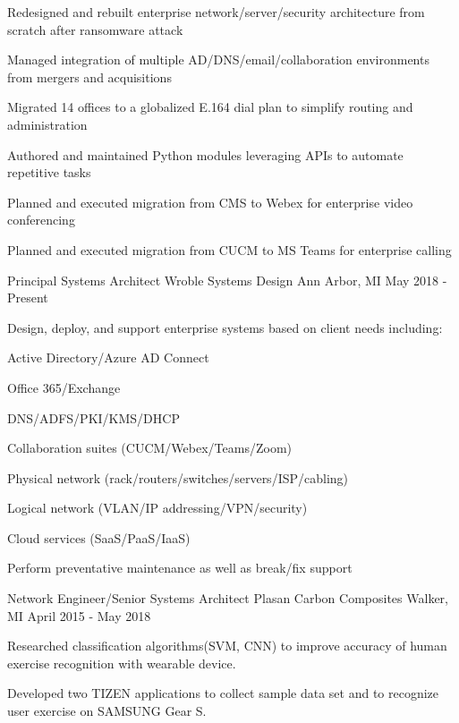 \begin{cventries}
{\begin{cvitems}
        \item {Redesigned and rebuilt enterprise network/server/security architecture from scratch after ransomware attack}
        \item {Managed integration of multiple AD/DNS/email/collaboration environments from mergers and acquisitions}
        \item {Migrated 14 offices to a globalized E.164 dial plan to simplify routing and administration}
        \item {Authored and maintained Python modules leveraging APIs to automate repetitive tasks}
        \item {Planned and executed migration from CMS to Webex for enterprise video conferencing}
        \item {Planned and executed migration from CUCM to MS Teams for enterprise calling}
      \end{cvitems}
    }

  \cventry
    {Principal Systems Architect} %
    {Wroble Systems Design} %
    {Ann Arbor, MI} %
    {May 2018 - Present} %
    {
      \begin{cvitems} %
        \item {Design, deploy, and support enterprise systems based on client needs including:}
        \item {Active Directory/Azure AD Connect}
        \item {Office 365/Exchange}
        \item {DNS/ADFS/PKI/KMS/DHCP}
        \item {Collaboration suites (CUCM/Webex/Teams/Zoom)}
        \item {Physical network (rack/routers/switches/servers/ISP/cabling)}
        \item {Logical network (VLAN/IP addressing/VPN/security)}
        \item {Cloud services (SaaS/PaaS/IaaS)}
        \item {Perform preventative maintenance as well as break/fix support}
      \end{cvitems}
    }

  \cventry
    {Network Engineer/Senior Systems Architect} %
    {Plasan Carbon Composites} %
    {Walker, MI} %
    {April 2015 - May 2018} %
    {
      \begin{cvitems} %
        \item {Researched classification algorithms(SVM, CNN) to improve accuracy of human exercise recognition with wearable device.}
        \item {Developed two TIZEN applications to collect sample data set and to recognize user exercise on SAMSUNG Gear S.}
      \end{cvitems}
    }


\end{cventries}
